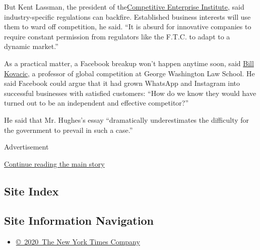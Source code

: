 But Kent Lassman, the president of the\href{http://cei.org/}{Competitive
Enterprise Institute}, said industry-specific regulations can backfire.
Established business interests will use them to ward off competition, he
said. ``It is absurd for innovative companies to require constant
permission from regulators like the F.T.C. to adapt to a dynamic
market.''

As a practical matter, a Facebook breakup won't happen anytime soon,
said \href{https://www.law.gwu.edu/william-e-kovacic}{Bill Kovacic}, a
professor of global competition at George Washington Law School. He said
Facebook could argue that it had grown WhatsApp and Instagram into
successful businesses with satisfied customers: ``How do we know they
would have turned out to be an independent and effective competitor?''

He said that Mr. Hughes's essay ``dramatically underestimates the
difficulty for the government to prevail in such a case.''

Advertisement

\protect\hyperlink{after-bottom}{Continue reading the main story}

\hypertarget{site-index}{%
\subsection{Site Index}\label{site-index}}

\hypertarget{site-information-navigation}{%
\subsection{Site Information
Navigation}\label{site-information-navigation}}

\begin{itemize}
\tightlist
\item
  \href{https://help.nytimes3xbfgragh.onion/hc/en-us/articles/115014792127-Copyright-notice}{©~2020~The
  New York Times Company}
\end{itemize}

